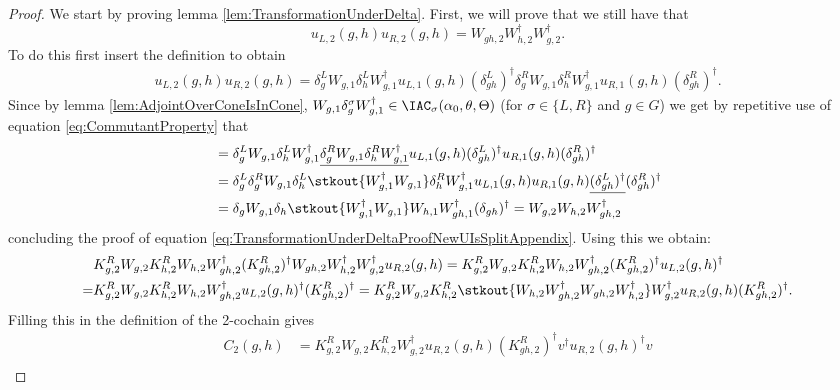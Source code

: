 \begin{proof}
	We start by proving lemma \ref{lem:TransformationUnderDelta}. First, we will prove that we still have that
	\begin{equation}\label{eq:TransformationUnderDeltaProofNewUIsSplitAppendix}
		u_{L,2}(g,h)u_{R,2}(g,h)=W_{gh,2}W_{h,2}^\dagger W_{g,2}^\dagger.
	\end{equation}
	To do this first insert the definition to obtain
	\begin{align}
		u_{L,2}(g,h)u_{R,2}(g,h)=\delta_g^L W_{g,1}\delta_h^L W_{g,1}^\dagger u_{L,1}(g,h)(\delta_{gh}^L)^\dagger \delta_g^R W_{g,1}\delta_h^R W_{g,1}^\dagger u_{R,1}(g,h)(\delta_{gh}^R)^\dagger.
	\end{align}
	Since by lemma \ref{lem:AdjointOverConeIsInCone}, $ W_{g,1}\delta_g^\sigma W_{g,1}^\dagger\in\IAC_\sigma(\alpha_0,\theta,\Theta)$ (for $\sigma\in\{L,R\}$ and $g\in G$) we get by repetitive use of equation \eqref{eq:CommutantProperty} that
	\begin{align}
		&=\delta_g^L W_{g,1}\delta_h^L W_{g,1}^\dagger \underline{\delta_g^R W_{g,1}\delta_h^R W_{g,1}^\dagger} u_{L,1}(g,h)(\delta_{gh}^L)^\dagger  u_{R,1}(g,h)(\delta_{gh}^R)^\dagger\\
		\nonumber
		&=\delta_g^L \delta_g^R W_{g,1}\delta_h^L \stkout{ W_{g,1}^\dagger W_{g,1}}\delta_h^R W_{g,1}^\dagger u_{L,1}(g,h)  u_{R,1}(g,h)\underline{(\delta_{gh}^L)^\dagger}(\delta_{gh}^R)^\dagger\\
		\nonumber
		&=\delta_g W_{g,1}\delta_h \stkout{W_{g,1}^\dagger W_{g,1}} W_{h,1} W_{gh,1}^\dagger(\delta_{gh})^\dagger=W_{g,2}W_{h,2}W_{gh,2}^\dagger
	\end{align}
	concluding the proof of equation \eqref{eq:TransformationUnderDeltaProofNewUIsSplitAppendix}. Using this we obtain:
	\begin{align}
		&K_{g,2}^RW_{g,2}K_{h,2}^{R}W_{h,2}W_{gh,2}^\dagger(K_{gh,2}^R)^\dagger W_{gh,2}W_{h,2}^\dagger W_{g,2}^\dagger u_{R,2}(g,h)=K_{g,2}^RW_{g,2}K_{h,2}^{R}W_{h,2}W_{gh,2}^\dagger(K_{gh,2}^R)^\dagger u_{L,2}(g,h)^\dagger\\
		=&K_{g,2}^RW_{g,2}K_{h,2}^{R}W_{h,2}W_{gh,2}^\dagger u_{L,2}(g,h)^\dagger (K_{gh,2}^R)^\dagger=K_{g,2}^RW_{g,2}K_{h,2}^{R}\stkout{W_{h,2}W_{gh,2}^\dagger W_{gh,2}W_{h,2}^\dagger} W_{g,2}^\dagger u_{R,2}(g,h) (K_{gh,2}^R)^\dagger.
	\end{align}
	Filling this in the definition of the 2-cochain gives
	\begin{align}
		\nonumber
		C_2(g,h)&=K_{g,2}^RW_{g,2}K_{h,2}^{R}W_{g,2}^\dagger u_{R,2}(g,h) (K_{gh,2}^R)^\dagger v^\dagger u_{R,2}(g,h)^\dagger v\\

\end{align}
\end{proof}
